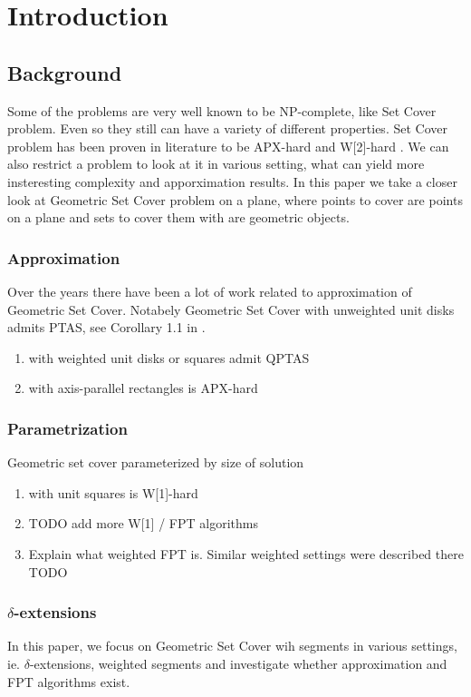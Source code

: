 \chapter{Introduction}

\section{Background}
Some of the problems are very well known to be NP-complete, like
Set Cover problem. Even so they still can have a variety
of different properties. Set Cover problem has been proven
in literature to be APX-hard and W[2]-hard \cite{platypus_book}.
We can also restrict a problem to look at it in various setting,
what can yield more insteresting complexity and apporximation results.
In this paper we take a closer look at Geometric Set Cover problem
on a plane, where points to cover are points on a plane
and sets to cover them with are geometric objects.

\subsection{Approximation}
Over the years there have been a lot of work related to approximation
of Geometric Set Cover. Notabely 
Geometric Set Cover with unweighted unit disks admits PTAS, see
Corollary 1.1 in \cite{unit_disks}.

	\begin{enumerate}
		\item with weighted unit disks or squares admit QPTAS \cite{voronoi_true}
		\item with axis-parallel rectangles is APX-hard \cite{settling_apx_hardness}
	\end{enumerate}
\subsection{Parametrization}
Geometric set cover parameterized by size of solution
	\begin{enumerate}
		\item with unit squares is W[1]-hard \cite{marx05}
		\item TODO add more W[1] / FPT algorithms
\item Explain what weighted FPT is. Similar weighted settings
were described there TODO
	\end{enumerate}

\subsection{$\delta$-extensions}
In this paper, we focus on Geometric Set Cover wih segments
in various settings, ie. $\delta$-extensions, weighted segments
and investigate whether approximation and FPT algorithms exist.

